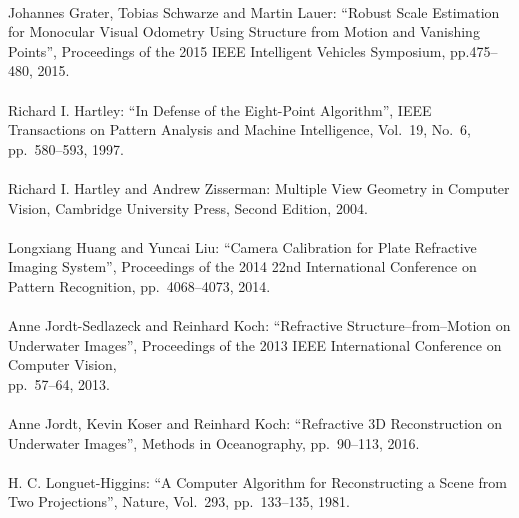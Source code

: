 \begin{mythebibliography}{}
\leavevmode \\Johannes Grater, Tobias Schwarze and Martin Lauer:
\newblock ``Robust Scale Estimation for Monocular Visual Odometry Using Structure from Motion and Vanishing Points'',
\newblock Proceedings of the 2015 IEEE Intelligent Vehicles Symposium, pp.475--480, 2015.
\\

\leavevmode \\Richard I. Hartley:
\newblock ``In Defense of the Eight-Point Algorithm'',
\newblock IEEE Transactions on Pattern Analysis and Machine Intelligence, Vol.~19, No.~6, pp.~580--593, 1997.
\\

\leavevmode \\Richard I. Hartley and Andrew Zisserman:
\newblock Multiple View Geometry in Computer Vision,
\newblock Cambridge University Press, Second Edition, 2004.
\\

\leavevmode \\Longxiang Huang and Yuncai Liu:
\newblock ``Camera Calibration for Plate Refractive Imaging System'',
\newblock Proceedings of the 2014 22nd International Conference on Pattern Recognition, pp.~4068--4073, 2014.
\\



\leavevmode \\Anne Jordt-Sedlazeck and Reinhard Koch:
\newblock ``Refractive Structure--from--Motion on Underwater Images'',
\newblock Proceedings of the 2013 IEEE International Conference on Computer Vision, \\pp.~57--64, 2013.
\\



\leavevmode \\Anne Jordt, Kevin Koser and Reinhard Koch:
\newblock ``Refractive 3D Reconstruction on Underwater Images'',
\newblock Methods in Oceanography, pp.~90--113, 2016.
\\

\leavevmode \\H. C. Longuet-Higgins:
\newblock ``A Computer Algorithm for Reconstructing a Scene from Two Projections'',
\newblock Nature, Vol.~293, pp.~133--135, 1981.
\\


\end{mythebibliography}
